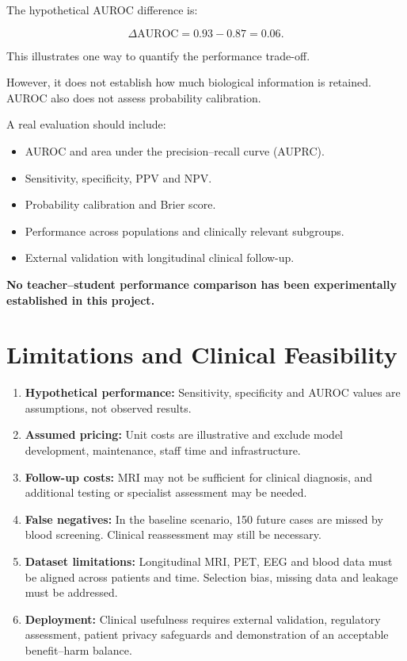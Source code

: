 \documentclass[11pt,a4paper]{article}
\begin{document}
The hypothetical AUROC difference is:

\[
\Delta\mathrm{AUROC}
=0.93-0.87
=\boxed{0.06}.
\]

This illustrates one way to quantify
the performance trade-off.

However, it does not establish how much
biological information is retained.
AUROC also does not assess probability calibration.

A real evaluation should include:

\begin{itemize}
    \item AUROC and area under the
    precision--recall curve (AUPRC).
    \item Sensitivity, specificity, PPV and NPV.
    \item Probability calibration and Brier score.
    \item Performance across populations
    and clinically relevant subgroups.
    \item External validation with longitudinal
    clinical follow-up.
\end{itemize}

\textbf{No teacher--student performance comparison
has been experimentally established in this project.}

\section{Limitations and Clinical Feasibility}

\begin{enumerate}[leftmargin=*]
    \item \textbf{Hypothetical performance:}
    Sensitivity, specificity and AUROC values
    are assumptions, not observed results.

    \item \textbf{Assumed pricing:}
    Unit costs are illustrative and exclude
    model development, maintenance,
    staff time and infrastructure.

    \item \textbf{Follow-up costs:}
    MRI may not be sufficient for clinical
    diagnosis, and additional testing
    or specialist assessment may be needed.

    \item \textbf{False negatives:}
    In the baseline scenario, 150 future cases
    are missed by blood screening.
    Clinical reassessment may still be necessary.

    \item \textbf{Dataset limitations:}
    Longitudinal MRI, PET, EEG and blood data
    must be aligned across patients and time.
    Selection bias, missing data and leakage
    must be addressed.

    \item \textbf{Deployment:}
    Clinical usefulness requires external
    validation, regulatory assessment,
    patient privacy safeguards and
    demonstration of an acceptable
    benefit--harm balance.
\end{enumerate}
\end{document}
